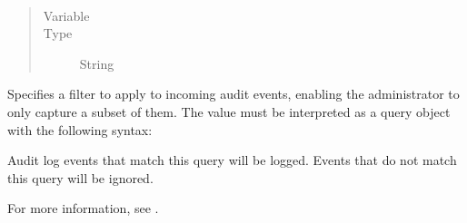 \documentclass[letterpaper,10pt,english]{sphinxmanual}
\begin{document}
\begin{fulllineitems}
\label{\detokenize{audit-logging:cmdoption-auditFilter}}~\begin{quote}\begin{description}
\item[{Variable}] \leavevmode
\sphinxAtStartPar
{}

\item[{Type}] \leavevmode
\sphinxAtStartPar
String

\end{description}\end{quote}

\sphinxAtStartPar
Specifies a filter to apply to incoming audit events,
enabling the administrator to only capture a subset of them.
The value must be interpreted as a query object with the following syntax:

\begin{sphinxVerbatim}[commandchars=\\\{\}]
    
\end{sphinxVerbatim}

\sphinxAtStartPar
Audit log events that match this query will be logged.
Events that do not match this query will be ignored.

\sphinxAtStartPar
For more information, see {\hyperref[\detokenize{audit-logging:audit-filter-examples}]{}}.

\end{fulllineitems}

\end{document}
